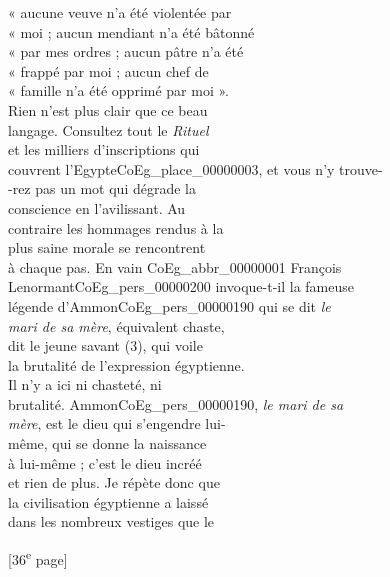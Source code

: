 \documentclass{book}
\begin{document}
{\begin{paracol}{2}
« aucune veuve n’a été violentée par\\
« moi ; aucun mendiant n’a été bâtonné\\
« par mes ordres ; aucun pâtre n’a été\\
« frappé par moi ; aucun chef de\\
« famille n’a été opprimé par moi ».\\
Rien n’est plus clair que ce beau\\
langage. Consultez tout le \textit{Rituel}\\
et les milliers d’inscriptions qui\\
couvrent l’Egypte\gls{CoEg_place_00000003}, et vous n’y trouve-\\
-rez pas un mot qui dégrade la\\
conscience en l’avilissant. Au\\
contraire les hommages rendus à la\\
plus saine morale se rencontrent\\
à chaque pas. En vain \gls{CoEg_abbr_00000001} François\\
Lenormant\gls{CoEg_pers_00000200} invoque-t-il la fameuse\\
légende d’Ammon\gls{CoEg_pers_00000190} qui se dit \textit{le\\
mari de sa mère}, équivalent chaste,\\
dit le jeune savant (3), qui voile\\
la brutalité de l’expression égyptienne.\\
Il n’y a ici ni chasteté, ni\\
brutalité. Ammon\gls{CoEg_pers_00000190}, \textit{le mari de sa\\
mère}, est le dieu qui s’engendre lui-\\
même, qui se donne la naissance\\
à lui-même ; c’est le dieu incréé\\
et rien de plus. Je répète donc que\\
la civilisation égyptienne a laissé\\
dans les nombreux vestiges que le
\end{paracol}

{\footnotesize\begin{center} {[36\textsuperscript{e} page]}\end{center}}

}
\end{document}
